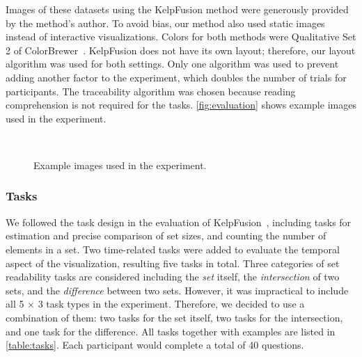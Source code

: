
Images of these datasets using the KelpFusion method were generously provided by the method's author. To avoid bias, our method also used static images instead of interactive visualizations. Colors for both methods were Qualitative Set 2 of ColorBrewer~\cite{Harrower2003}. KelpFusion does not have its own layout; therefore, our layout algorithm was used for both settings. Only one algorithm was used to prevent adding another factor to the experiment, which doubles the number of trials for participants. The traceability algorithm was chosen because reading comprehension is not required for the tasks. \autoref{fig:evaluation} shows example images used in the experiment.

\begin{figure}[!htb]
	\centering
	\\
	\caption{Example images used in the experiment.}
	\label{fig:evaluation}
\end{figure}

\subsubsection{Tasks} We followed the task design in the evaluation of KelpFusion~\cite{Meulemans2013}, including tasks for estimation and precise comparison of set sizes, and counting the number of elements in a set. Two time-related tasks were added to evaluate the temporal aspect of the  visualization, resulting five tasks in total. Three categories of set readability tasks are considered including the \textit{set} itself, the \textit{intersection} of two sets, and the \textit{difference} between two sets. However, it was impractical to include all 5 $\times$ 3 task types in the experiment. Therefore, we decided to use a combination of them: two tasks for the set itself, two tasks for the intersection, and one task for the difference. All tasks together with examples are listed in \autoref{table:tasks}. Each participant would complete a total of 40 questions.

